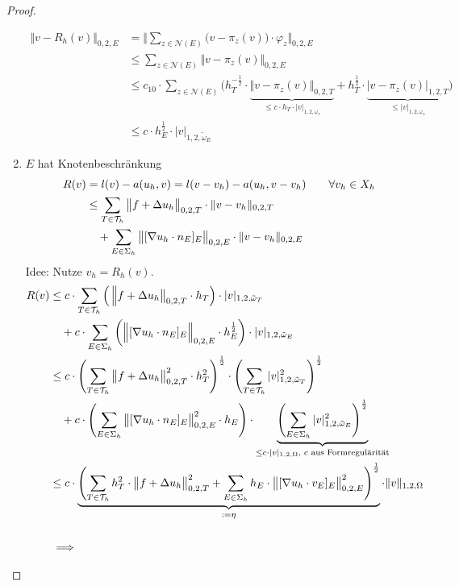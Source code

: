\begin{proof}
\begin{enumerate}[label=\roman*)]
\begin{align*}
			\big\Vert v-R_h(v)\big\Vert_{0,2,E}
			&=\Bigg\Vert\sum\limits_{z\in\mathcal{N}(E)}\big(v-\pi_z(v)\big)\cdot\varphi_z\Bigg\Vert_{0,2,E}\\
			&\leq
			\sum\limits_{z\in\mathcal{N}(E)}\big\Vert v-\pi_z(v)\big\Vert_{0,2,E}\\
			&\leq
			c_{10}\cdot\sum\limits_{z\in\mathcal{N}(E)}\Big(h_T^{-\frac{1}{2}}\cdot\underbrace{\big\Vert v-\pi_z(v)\big\Vert_{0,2,T}}_{\leq c\cdot h_T\cdot|v|_{1,2,\omega_z}}+h_T^{\frac{1}{2}}\cdot\underbrace{\big|v-\pi_z(v)\big|_{1,2,T}}_{\leq|v|_{1,2,\omega_z}}\Big)\\
			&\leq
			c\cdot h_E^{\frac{1}{2}}\cdot|v|_{1,2,\tilde{\omega}_E}
		\end{align*}
		\item $E$ hat Knotenbeschränkung
		\begin{align*}
			R(v)&=l(v)-a(u_h,v)=l(v-v_h)-a(u_h,v-v_h)\qquad\forall v_h\in X_h\\
			&\leq\sum\limits_{T\in\mathcal{T}_h}\big\Vert f+\Delta u_h\big\Vert_{0,2,T}\cdot\Vert v-v_h\Vert_{0,2,T}\\
			&{}\quad+\sum\limits_{E\in\Sigma_h}\big\Vert[\nabla u_h\cdot n_E]_E\big\Vert_{0,2,E}\cdot\Vert v-v_h\Vert_{0,2,E}
		\end{align*}
		Idee: Nutze $v_h=R_h(v)$.
		\begin{align*}
			R(v)&\leq
			c\cdot\sum\limits_{T\in\T_h}\Big(\left\Vert f+ \Delta u_h\big\Vert_{0,2,T}\cdot h_T\right)\cdot |v|_{1,2,\tilde{\omega}_T}\\
			&\quad+c\cdot\sum\limits_{E\in\Sigma_h}\left(\Big\Vert[\nabla u_h\cdot n_E]_E\Big\Vert_{0,2,E}\cdot h_E^{\frac{1}{2}}\right)\cdot|v|_{1,2,\tilde{\omega}_E}\\
			&\leq
			c\cdot\left(\sum\limits_{T\in\T_h}\big\Vert f+\Delta u_h\big\Vert^2_{0,2,T}\cdot h_T^2\right)^{\frac{1}{2}}\cdot\left(\sum\limits_{T\in\T_h}|v|^2_{1,2,\tilde{\omega}_T}\right)^{\frac{1}{2}}\\
			&\quad+c\cdot\left(\sum\limits_{E\in\Sigma_h}\big\Vert[\nabla u_h\cdot n_E]_E\big\Vert^2_{0,2,E}\cdot h_E\right)\cdot\underbrace{\left(\sum\limits_{E\in\Sigma_h}|v|^2_{1,2,\tilde{\omega}_E}\right)^{\frac{1}{2}}}_{\leq c\cdot |v|_{1,2,\Omega}\text{, $c$ aus Formregulärität}}\\
			&\leq
			c\cdot\underbrace{\left(\sum\limits_{T\in\T_h} h^2_T\cdot\big\Vert f+\Delta u_h\big\Vert^2_{0,2,T}
			+\sum\limits_{E\in\Sigma_h}h_E\cdot\big\Vert[\nabla u_h\cdot v_E]_E\big\Vert^2_{0,2,E}\right)^{\frac{1}{2}}}_{:=\eta}\cdot\Vert v\Vert_{1,2,\Omega}\nl
			&\implies

\end{align*}
\end{enumerate}
\end{proof}

